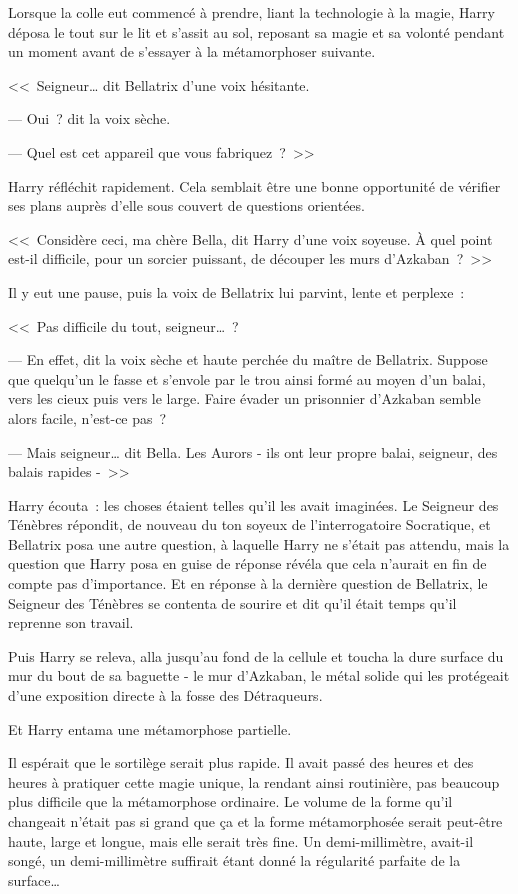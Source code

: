 Lorsque la colle eut commencé à prendre, liant la technologie à la magie, Harry déposa le tout sur le lit et s'assit au sol, reposant sa magie et sa volonté pendant un moment avant de s'essayer à la métamorphoser suivante.

<<~Seigneur… dit Bellatrix d'une voix hésitante.

--- Oui~? dit la voix sèche.

--- Quel est cet appareil que vous fabriquez~?~>>

Harry réfléchit rapidement. Cela semblait être une bonne opportunité de vérifier ses plans auprès d'elle sous couvert de questions orientées.

<<~Considère ceci, ma chère Bella, dit Harry d'une voix soyeuse. À quel point est-il difficile, pour un sorcier puissant, de découper les murs d'Azkaban~?~>>

Il y eut une pause, puis la voix de Bellatrix lui parvint, lente et perplexe~:

<<~Pas difficile du tout, seigneur…~?

--- En effet, dit la voix sèche et haute perchée du maître de Bellatrix. Suppose que quelqu'un le fasse et s'envole par le trou ainsi formé au moyen d'un balai, vers les cieux puis vers le large. Faire évader un prisonnier d'Azkaban semble alors facile, n'est-ce pas~?

--- Mais seigneur… dit Bella. Les Aurors - ils ont leur propre balai, seigneur, des balais rapides -~>>

Harry écouta~: les choses étaient telles qu'il les avait imaginées. Le Seigneur des Ténèbres répondit, de nouveau du ton soyeux de l'interrogatoire Socratique, et Bellatrix posa une autre question, à laquelle Harry ne s'était pas attendu, mais la question que Harry posa en guise de réponse révéla que cela n'aurait en fin de compte pas d'importance. Et en réponse à la dernière question de Bellatrix, le Seigneur des Ténèbres se contenta de sourire et dit qu'il était temps qu'il reprenne son travail.

Puis Harry se releva, alla jusqu'au fond de la cellule et toucha la dure surface du mur du bout de sa baguette - le mur d'Azkaban, le métal solide qui les protégeait d'une exposition directe à la fosse des Détraqueurs.

Et Harry entama une métamorphose partielle.

Il espérait que le sortilège serait plus rapide. Il avait passé des heures et des heures à pratiquer cette magie unique, la rendant ainsi routinière, pas beaucoup plus difficile que la métamorphose ordinaire. Le volume de la forme qu'il changeait n'était pas si grand que ça et la forme métamorphosée serait peut-être haute, large et longue, mais elle serait très fine. Un demi-millimètre, avait-il songé, un demi-millimètre suffirait étant donné la régularité parfaite de la surface…

